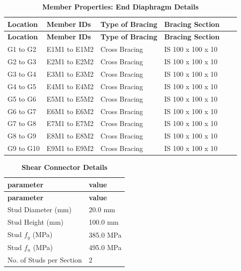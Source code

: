 \documentclass[12pt,a4paper]{report}
\numberwithin{table}{chapter}
\numberwithin{figure}{chapter}
\newcommand{\ReportTableRowGap}{6pt}
\begin{document}
\begin{longtable}{|L{2.2cm}|L{2.2cm}|L{3.0cm}|L{2.5cm}|C{1.8cm}|C{1.8cm}|}
\caption{\textbf{Member Properties: End Diaphragm Details}}\\
\hline
\textbf{Location} & \textbf{Member IDs} & \textbf{Type of Bracing} & \textbf{Bracing Section} \\
\hline
\endfirsthead
\hline
\textbf{Location} & \textbf{Member IDs} & \textbf{Type of Bracing} & \textbf{Bracing Section} \\
\hline
\endhead

G1 to G2 & E1M1 to E1M2 & Cross Bracing & IS 100 x 100 x 10 \\[\ReportTableRowGap]
\hline
G2 to G3 & E2M1 to E2M2 & Cross Bracing & IS 100 x 100 x 10 \\[\ReportTableRowGap]
\hline
G3 to G4 & E3M1 to E3M2 & Cross Bracing & IS 100 x 100 x 10 \\[\ReportTableRowGap]
\hline
G4 to G5 & E4M1 to E4M2 & Cross Bracing & IS 100 x 100 x 10 \\[\ReportTableRowGap]
\hline
G5 to G6 & E5M1 to E5M2 & Cross Bracing & IS 100 x 100 x 10 \\[\ReportTableRowGap]
\hline
G6 to G7 & E6M1 to E6M2 & Cross Bracing & IS 100 x 100 x 10 \\[\ReportTableRowGap]
\hline
G7 to G8 & E7M1 to E7M2 & Cross Bracing & IS 100 x 100 x 10 \\[\ReportTableRowGap]
\hline
G8 to G9 & E8M1 to E8M2 & Cross Bracing & IS 100 x 100 x 10 \\[\ReportTableRowGap]
\hline
G9 to G10 & E9M1 to E9M2 & Cross Bracing & IS 100 x 100 x 10 \\[\ReportTableRowGap]
\hline
\end{longtable}



\label{subsec:shear-connectors}

\vspace{2.2em}

\vspace{0.4em}
\begin{longtable}{|L{5.5cm}|p{10.0cm}|}
\caption{\textbf{Shear Connector Details}}\\
\hline
\textbf{parameter} & \textbf{value} \\
\hline
\endfirsthead
\hline
\textbf{parameter} & \textbf{value} \\
\hline
\endhead

\textnormal{Stud Diameter (mm)} & 20.0 mm \\[\ReportTableRowGap]
\hline
\textnormal{Stud Height (mm)} & 100.0 mm \\[\ReportTableRowGap]
\hline
\textnormal{Stud $f_y$ (MPa)} & 385.0 MPa \\[\ReportTableRowGap]
\hline
\textnormal{Stud $f_u$ (MPa)} & 495.0 MPa \\[\ReportTableRowGap]
\hline
\textnormal{No. of Studs per Section} & 2 \\[\ReportTableRowGap]
\hline
\end{longtable}
\end{document}
